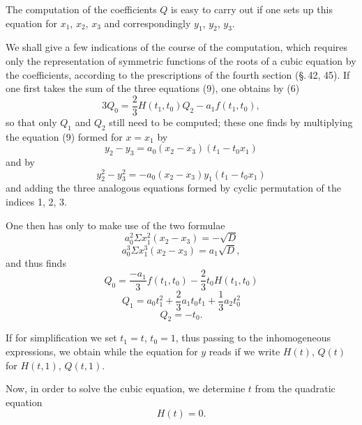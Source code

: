 
The computation of the coefficients $Q$ is easy to carry out if one sets up this equation for $x_1$, $x_2$, $x_3$ and correspondingly $y_1$, $y_2$, $y_3$.

We shall give a few indications of the course of the computation, which requires only the representation of symmetric functions of the roots of a cubic equation by the coefficients, according to the prescriptions of the fourth section (\S.\,42, 45). If one first takes the sum of the three equations (9), one obtains by (6)
\[
3 Q_0 = \frac{2}{3} H(t_1, t_0) Q_2 - a_1 f(t_1, t_0),
\]
so that only $Q_1$ and $Q_2$ still need to be computed; these one finds by multiplying the equation (9) formed for $x = x_1$ by
\[
y_2 - y_3 = a_0 (x_2 - x_3) (t_1 - t_0 x_1)
\]
and by
\[
y_2^2 - y_3^2 = -a_0 (x_2 - x_3) y_1 (t_1 - t_0 x_1)
\]
and adding the three analogous equations formed by cyclic permutation of the indices 1, 2, 3.

One then has only to make use of the two formulae
\[
a_0^2 \Sigma x_1^2 (x_2 - x_3) = -\sqrt{D}
\]
\[
a_0^3 \Sigma x_1^3 (x_2 - x_3) = a_1 \sqrt{D},
\]
and thus finds
\[
Q_0 = \frac{-a_1}{3} f(t_1, t_0) - \frac{2}{3} t_0 H(t_1, t_0)
\]
\[
Q_1 = a_0 t_1^2 + \frac{2}{3} a_1 t_0 t_1 + \frac{1}{3} a_2 t_0^2
\]
\[
Q_2 = -t_0.
\]

If for simplification we set $t_1 = t$, $t_0 = 1$, thus passing to the inhomogeneous expressions, we obtain
while the equation for $y$ reads
if we write $H(t)$, $Q(t)$ for $H(t, 1)$, $Q(t, 1)$.

Now, in order to solve the cubic equation, we determine $t$ from the quadratic equation
\[
H(t) = 0.
\]
